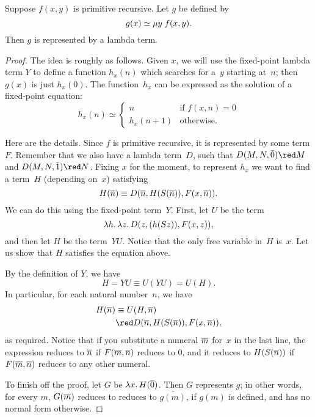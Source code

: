 \documentclass[../../include/open-logic-section]{subfiles}
\begin{document}

\begin{lem}
Suppose $f(x,y)$ is primitive recursive. Let $g$ be defined by
\[
g(x) \simeq \mu y \; f(x,y).
\]
Then $g$ is represented by a lambda term.
\end{lem}

\begin{proof}
The idea is roughly as follows. Given $x$, we will use the fixed-point
lambda term $Y$ to define a function $h_x(n)$ which searches for a~$y$
starting at~$n$; then $g(x)$ is just $h_x(0)$. The function~$h_x$ can
be expressed as the solution of a fixed-point equation:
\[
h_x(n) \simeq
\begin{cases}
n & \text{if $f(x,n) = 0$} \\
h_x(n+1) & \text{otherwise.}
\end{cases}
\]

Here are the details. Since $f$ is primitive recursive, it is
represented by some term $F$. Remember that we also have a lambda
term~$D$, such that $D(M, N, \bar{0}) \red M$ and $D(M, N, \bar{1})
\red N$. Fixing $x$ for the moment, to represent $h_x$ we want to
find a term~$H$ (depending on~$x$) satisfying
\[
H(\overline{n}) \equiv D(\overline{n}, H(S(\overline{n})), F(x, \overline{n})).
\]
We can do this using the fixed-point term~$Y$. First, let $U$ be the
term
\[
\lambd[h][\lambd[z][D(z,(h(Sz)),F(x,z))]],
\]
and then let $H$ be the term~$YU$. Notice that the only free variable
in~$H$ is~$x$. Let us show that $H$ satisfies the equation above.

By the definition of $Y$, we have
\[
H = YU \equiv U(YU) = U(H).
\]
In particular, for each natural number~$n$, we have
\begin{align*}
H(\num{n}) & \equiv U(H, \num{n}) \\
& \red D(\num{n}, H(S(\num{n})), F(x, \num{n})),
\end{align*}
as required. Notice that if you substitute a numeral $\overline{m}$ for~$x$
in the last line, the expression reduces to $\overline{n}$ if $F(\overline{m},
\overline{n})$ reduces to $\num{0}$, and it reduces to $H(S(\overline{n}))$ if
$F(\overline{m}, \overline{n})$ reduces to any other numeral.

To finish off the proof, let $G$ be $\lambd[x][H(\num 0)]$. Then $G$
represents $g$; in other words, for every $m$, $G(\overline{m})$ reduces to
reduces to $\overline {g(m)}$, if $g(m)$ is defined, and has no
normal form otherwise.
\end{proof}
\end{document}

